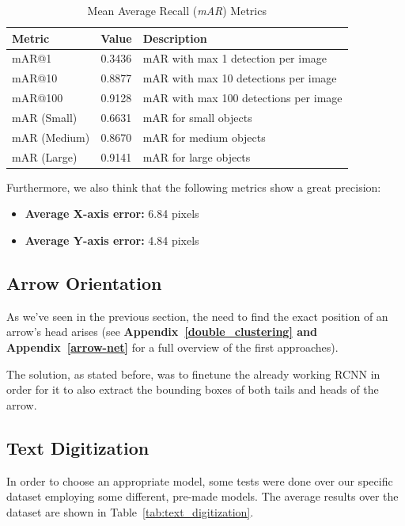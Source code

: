 \documentclass[conference]{IEEEtran}
\begin{document}
\begin{table}[htbp]
	\centering
	\caption{Mean Average Recall (\textit{mAR}) Metrics}
	\label{tab:mar}
	\begin{tabular}{|l|c|l|}
		\hline
		\textbf{Metric} & \textbf{Value} & \textbf{Description} \\
		\hline
		mAR@1 & 0.3436 & mAR with max 1 detection per image \\
		mAR@10 & 0.8877 & mAR with max 10 detections per image \\
		mAR@100 & 0.9128 & mAR with max 100 detections per image \\
		\hline
		mAR (Small) & 0.6631 & mAR for small objects \\
		mAR (Medium) & 0.8670 & mAR for medium objects \\
		mAR (Large) & 0.9141 & mAR for large objects \\
		\hline
	\end{tabular}
\end{table}

Furthermore, we also think that the following metrics show a great precision:

\begin{itemize}
	\item \textbf{Average X-axis error:} 6.84 pixels
	\item \textbf{Average Y-axis error:} 4.84 pixels
\end{itemize}


\subsection{Arrow Orientation}
\label{exp:arrow_orientation}
As we've seen in the previous section, the need to find the exact position of an arrow's head arises (see \textbf{Appendix~\ref{double_clustering} and \textbf{Appendix}~\ref{arrow-net}} for a full overview of the first approaches).

The solution, as stated before, was to finetune the already working RCNN in order for it to also extract the bounding boxes of both tails and heads of the arrow.

\subsection{Text Digitization}
In order to choose an appropriate model, some tests were done over our specific dataset employing some different, pre-made models. The average results over the dataset are shown in Table~\ref{tab:text_digitization}.
\end{document}

